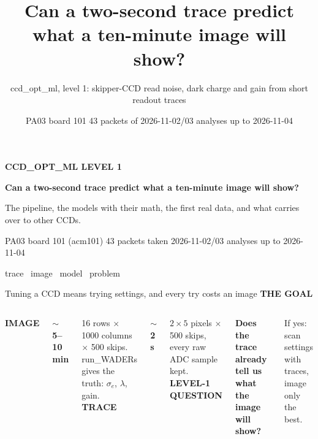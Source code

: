 \documentclass[aspectratio=169,11pt]{beamer}
\title{Can a two-second trace predict what a ten-minute image will show?}
\subtitle{ccd\_opt\_ml, level 1: skipper-CCD read noise, dark charge and gain from short readout traces}
\date{PA03 \textperiodcentered{} board 101 \textperiodcentered{} 43 packets of 2026-11-02/03 \textperiodcentered{} analyses up to 2026-11-04}
\newcommand{\eyebrow}[2][trace]{{\color{#1}\scriptsize\bfseries\MakeUppercase{#2}}\par\vspace{0.2em}}
\begin{document}
{
\begin{frame}[plain]
\vfill
{\color{trace!60}\small\bfseries CCD\_OPT\_ML \textperiodcentered{} LEVEL 1}\par\vspace{0.8em}
{\color{paper}\LARGE\bfseries Can a two-second trace predict what a ten-minute image will show?}\par\vspace{1em}
{\color{paper!75}\normalsize The pipeline, the models with their math, the first real data, and what carries over to other CCDs.}\par\vfill
{\color{paper!75}\small PA03 \textperiodcentered{} board 101 (acm101) \textperiodcentered{} 43 packets taken 2026-11-02/03 \textperiodcentered{} analyses up to 2026-11-04}\par\vspace{0.5em}
{\small\colorbox{trace}{\color{paper} trace}\ \colorbox{image}{\color{paper} image}\ \colorbox{model}{\color{paper} model}\ \colorbox{problem}{\color{paper} problem}}
\end{frame}}

\begin{frame}{Tuning a CCD means trying settings, and every try costs an image}
\eyebrow{The goal}
\begin{columns}[T]
{\color{image}\bfseries IMAGE}\par{\Large\bfseries $\sim$5--10 min}\par\small 16 rows $\times$ 1000 columns $\times$ 500 skips. run\_WADERs gives the truth: $\sigma_e$, $\lambda$, gain.
{\color{trace}\bfseries TRACE}\par{\Large\bfseries $\sim$2 s}\par\small $2\times5$ pixels $\times$ 500 skips, every raw ADC sample kept.
{\color{model}\bfseries LEVEL-1 QUESTION}\par\normalsize\bfseries Does the trace already tell us what the image will show?\par\mdseries\small If yes: scan settings with traces, image only the best.
\end{columns}
\vspace{1.2em}
\begin{center}
\end{center}
\end{frame}
\end{document}
